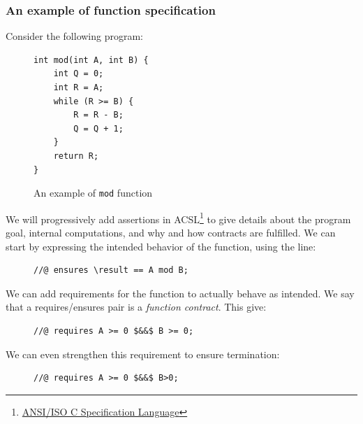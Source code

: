 \documentclass[toc]{../cs-classes/cs-classes}
\begin{document}
\subsubsection{An example of function specification}
Consider the following program:
\begin{figure}[H]
    \centering
    \begin{minipage}{0.3\textwidth}
        \begin{verbatim}
int mod(int A, int B) {
    int Q = 0;
    int R = A;
    while (R >= B) {
        R = R - B;
        Q = Q + 1;
    }
    return R;
}
        \end{verbatim}
    \end{minipage}
    \caption{An example of \texttt{mod} function}
\end{figure}
We will progressively add assertions in ACSL\footnote{\href{https://www.frama-c.com/html/acsl.html}{ANSI/ISO C Specification Language}} to give details about the program goal, internal computations, and why and how contracts are fulfilled. We can start by expressing the intended behavior of the function, using the line:
\begin{figure}[H]
    \centering
    \begin{minipage}{0.4\textwidth}
        \begin{verbatim}
//@ ensures \result == A mod B;
        \end{verbatim}
    \end{minipage}
\end{figure}
We can add requirements for the function to actually behave as intended. We say that a requires/ensures pair is a \emph{function contract}. This give:
\begin{figure}[H]
    \centering
    \begin{minipage}{0.4\textwidth}
        \begin{verbatim}
//@ requires A >= 0 $&&$ B >= 0;
        \end{verbatim}
    \end{minipage}
\end{figure}
We can even strengthen this requirement to ensure termination:
\begin{figure}[H]
    \centering
    \begin{minipage}{0.4\textwidth}
        \begin{verbatim}
//@ requires A >= 0 $&&$ B>0;
        \end{verbatim}
    \end{minipage}
\end{figure}
\end{document}
